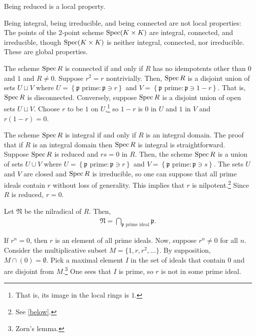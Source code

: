 \documentclass [11 pt, oneside] {article}
\begin{document}
\begin{remark}
	Being reduced is a local property.
\end{remark}

\begin{remark}
	Being integral, being irreducible, and being connected are not local properties: The points of the $2$-point scheme $\operatorname{Spec} (K\times K)$ are integral, connected, and irreducible, though $\operatorname{Spec}(K\times K)$ is neither integral, connected, nor irreducible. These are global properties.
\end{remark}

The scheme $\operatorname{Spec} R$ is connected if and only if $R$ has no idempotents other than $0$ and $1$ and $R\ne 0$. Suppose $r^2 = r$ nontrivially. Then, $\operatorname{Spec} R$ is a disjoint union of sets $U\sqcup V$ where $U = \left\{ \textrm{$\mathfrak{p}$ prime}: \mathfrak{p}\ni r \right\} $ and $V = \left\{\textrm{$\mathfrak{p}$ prime}: \mathfrak{p} \ni 1-r \right\}$. That is, $\operatorname{Spec} R$ is disconnected. Conversely, suppose $\operatorname{Spec} R$ is a disjoint union of open sets $U\sqcup V$. Choose $r$ to be $1$ on $U$,\footnote{That is, its image in the local rings is $1$.} so $1-r$ is $0$ in $U$ and $1$ in $V$ and $r(1-r)=0$.

The scheme $\operatorname{Spec} R$ is integral if and only if $R$ is an integral domain. The proof that if $R$ is an integral domain then $\operatorname{Spec} R$ is integral is straightforward. Suppose $\operatorname{Spec} R$ is reduced and $rs=0$ in $R$. Then, the scheme $\operatorname{Spec} R$ is a union of sets $U\cup V$ where $U = \left\{ \textrm{$\mathfrak{p}$ prime}: \mathfrak{p}\ni r \right\} $ and $V = \left\{\textrm{$\mathfrak{p}$ prime}: \mathfrak{p} \ni s \right\}$. The sets $U$ and $V$ are closed and $\operatorname{Spec} R$ is irreducible, so one can suppose that all prime ideals contain $r$ without loss of generality. This implies that $r$ is nilpotent.\footnote{See \cref{below}.} Since $R$ is reduced, $r=0$.
\begin{proposition}[ ]\label{below}\text{}
Let $\mathfrak{N}$ be the nilradical of $R$. Then,
\begin{align*}
	\mathfrak{N} = \bigcap_{\textrm{$\mathfrak{p}$ prime ideal}} \mathfrak{p}.
\end{align*}
\end{proposition}
\begin{esquisse}
	If $r^n =0$, then $r$ is an element of all prime ideals. Now, suppose $r^n\ne 0$ for all $n$. Consider the multiplicative subset $M = \{1,r,r^2,\hdots\}$. By supposition, $M\cap (0)=\emptyset$. Pick a maximal element $I$ in the set of ideals that contain $0$ and are disjoint from $M$.\footnote{Zorn's lemma.} One sees that $I$ is prime, so $r$ is not in some prime ideal.
\end{esquisse}
\end{document}
